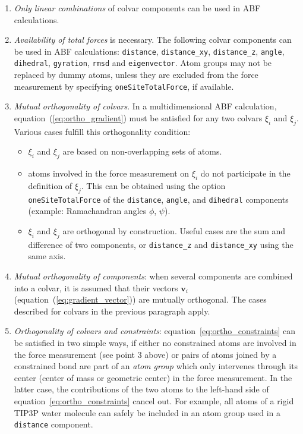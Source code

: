 \begin{enumerate}
 \item \emph{Only linear combinations} of colvar components can be used in ABF calculations.
 \item \emph{Availability of total forces} is necessary. The following colvar components
can be used in ABF calculations:
\texttt{distance}, \texttt{distance\_xy}, \texttt{distance\_z}, \texttt{angle},
\texttt{dihedral}, \texttt{gyration},  \texttt{rmsd} and \texttt{eigenvector}.
Atom groups may not be replaced by dummy atoms, unless they are excluded
from the force measurement by specifying \texttt{oneSiteTotalForce}, if available.
 \item \emph{Mutual orthogonality of colvars}. In a multidimensional ABF calculation,
equation~(\ref{eq:ortho_gradient}) must be satisfied for any two colvars $\xi_{i}$ and $\xi_{j}$.
Various cases fulfill this orthogonality condition:
\begin{itemize}
 \item $\xi_{i}$ and $\xi_{j}$ are based on non-overlapping sets of atoms.
 \item atoms involved in the force measurement on $\xi_{i}$ do not participate in
the definition of $\xi_{j}$. This can be obtained using the option \texttt{oneSiteTotalForce}
of the \texttt{distance}, \texttt{angle}, and \texttt{dihedral} components
(example: Ramachandran angles $\phi$, $\psi$).
 \item $\xi_{i}$ and $\xi_{j}$ are orthogonal by construction. Useful cases are the sum and
difference of two components, or \texttt{distance\_z} and \texttt{distance\_xy} using the same axis.
\end{itemize}
 \item \emph{Mutual orthogonality of components}: when several components are combined into a colvar,
it is assumed that their vectors $\bm{v}_{i}$ (equation~(\ref{eq:gradient_vector}))
are mutually orthogonal. The cases described for colvars in the previous paragraph apply.
 \item \emph{Orthogonality of colvars and constraints}: equation~\ref{eq:ortho_constraints} can
be satisfied in two simple ways, if either no constrained atoms are involved in the force measurement
(see point 3 above) or pairs of atoms joined by a constrained bond are part of an \textit{atom group}
which only intervenes through its center (center of mass or geometric center) in the force measurement.
In the latter case, the contributions of the two atoms to the left-hand side of equation~\ref{eq:ortho_constraints}
cancel out. For example, all atoms of a rigid TIP3P water molecule can safely be included in an atom
group used in a \texttt{distance} component.
\end{enumerate}


